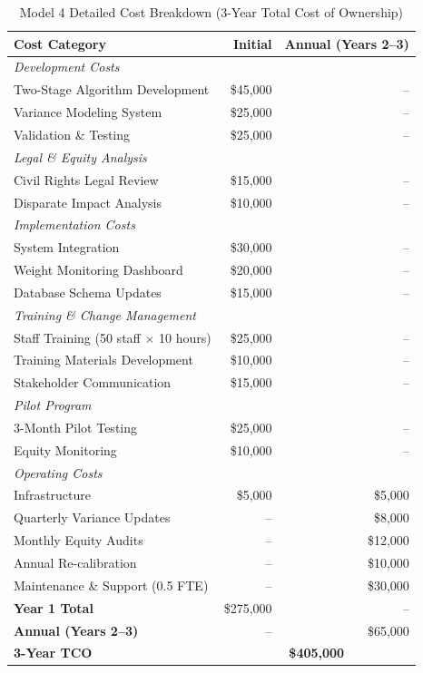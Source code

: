\begin{table}[h]
\centering
\caption{Model 4 Detailed Cost Breakdown (3-Year Total Cost of Ownership)}
\begin{tabular}{lrr}
\toprule
\textbf{Cost Category} & \textbf{Initial} & \textbf{Annual (Years 2--3)} \\
\midrule
\multicolumn{3}{l}{\textit{Development Costs}} \\
Two-Stage Algorithm Development & \$45,000 & -- \\
Variance Modeling System & \$25,000 & -- \\
Validation \& Testing & \$25,000 & -- \\
\midrule
\multicolumn{3}{l}{\textit{Legal \& Equity Analysis}} \\
Civil Rights Legal Review & \$15,000 & -- \\
Disparate Impact Analysis & \$10,000 & -- \\
\midrule
\multicolumn{3}{l}{\textit{Implementation Costs}} \\
System Integration & \$30,000 & -- \\
Weight Monitoring Dashboard & \$20,000 & -- \\
Database Schema Updates & \$15,000 & -- \\
\midrule
\multicolumn{3}{l}{\textit{Training \& Change Management}} \\
Staff Training (50 staff $\times$ 10 hours) & \$25,000 & -- \\
Training Materials Development & \$10,000 & -- \\
Stakeholder Communication & \$15,000 & -- \\
\midrule
\multicolumn{3}{l}{\textit{Pilot Program}} \\
3-Month Pilot Testing & \$25,000 & -- \\
Equity Monitoring & \$10,000 & -- \\
\midrule
\multicolumn{3}{l}{\textit{Operating Costs}} \\
Infrastructure & \$5,000 & \$5,000 \\
Quarterly Variance Updates & -- & \$8,000 \\
Monthly Equity Audits & -- & \$12,000 \\
Annual Re-calibration & -- & \$10,000 \\
Maintenance \& Support (0.5 FTE) & -- & \$30,000 \\
\midrule
\textbf{Year 1 Total} & \$275,000 & -- \\
\textbf{Annual (Years 2--3)} & -- & \$65,000 \\
\textbf{3-Year TCO} & \multicolumn{2}{c}{\textbf{\$405,000}} \\
\bottomrule
\end{tabular}
\end{table}


